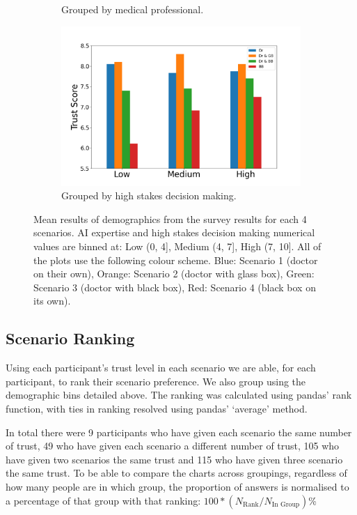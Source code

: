 \documentclass[manuscript,screen,review]{acmart}
\begin{document}
\begin{figure}[ht]
\begin{subfigure}[t]{.45\textwidth}
    \caption{Grouped by medical professional.}
  \end{subfigure}
  \begin{subfigure}[t]{.45\textwidth}
    \centering
    \includegraphics[width=\linewidth]{graphics/survey_averages/survey_stakes_grouped.png}
    \caption{Grouped by high stakes decision making.}
    \label{subfig:high stakes}
  \end{subfigure}
  \caption{Mean results of demographics from the survey results for each 4 scenarios. AI expertise and high stakes decision making numerical values are binned at: Low (0, 4], Medium (4, 7], High (7, 10]. All of the plots use the following colour scheme. Blue: Scenario 1 (doctor on their own), Orange: Scenario 2 (doctor with glass box), Green: Scenario 3 (doctor with black box), Red: Scenario 4 (black box on its own).}
  \label{fig:mean_survey_results}
\end{figure}

\subsection{Scenario Ranking}


Using each participant's trust level in each scenario we are able, for each participant, to rank their scenario preference. We also group using the demographic bins detailed above. The ranking was calculated using pandas' rank function, with ties in ranking resolved using pandas' `average' method\cite{mckinney-proc-scipy-2010}.

In total there were 9 participants who have given each scenario the same number of trust, 49 who have given each scenario a different number of trust, 105 who have given two scenarios the same trust and 115 who have given three scenario the same trust.  To be able to compare the charts across groupings, regardless of how many people are in which group, the proportion of answers is normalised to a percentage of that group with that ranking: $100*(N_{\textrm{Rank}}/N_{\textrm{In Group}})$\%
\end{document}
